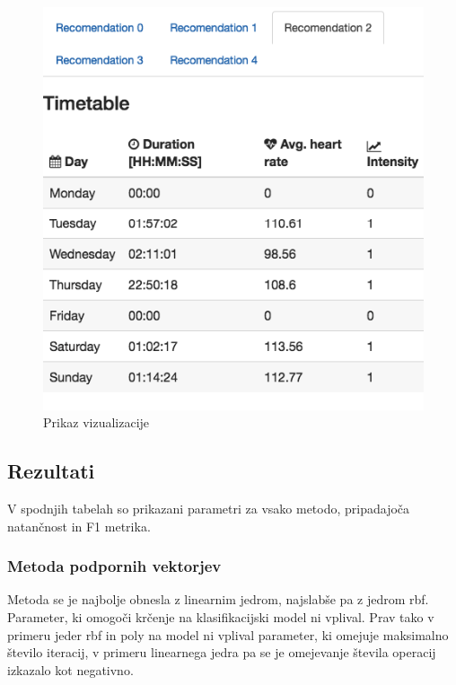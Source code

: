 \documentclass{acm_proc_article-sp}
\begin{document}
\begin{figure}
 \centering
 \includegraphics[width=\linewidth]{vizualization}
 \caption{Prikaz vizualizacije}
\end{figure}


\subsection{Rezultati}
V spodnjih tabelah so prikazani parametri za vsako metodo, pripadajoča natančnost in F1 metrika. 
\subsubsection{Metoda podpornih vektorjev}
Metoda se je najbolje obnesla z linearnim jedrom, najslabše pa z jedrom rbf. Parameter, ki omogoči krčenje na klasifikacijski model ni vplival. Prav tako v primeru jeder rbf in poly na model ni vplival parameter, ki omejuje maksimalno število iteracij, v primeru linearnega jedra pa se je omejevanje števila operacij izkazalo kot negativno.
\end{document}
